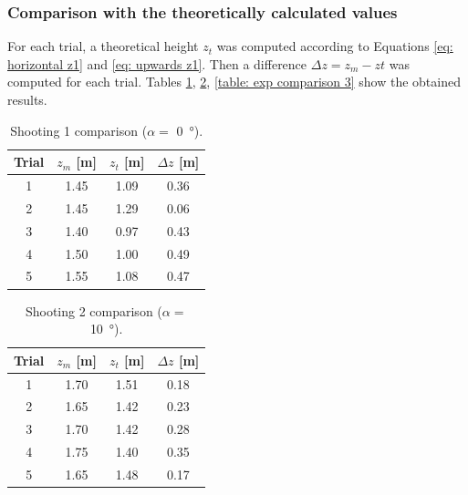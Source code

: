 		\subsubsection{Comparison with the theoretically calculated values}

			For each trial, a theoretical height $z_{t}$ was computed according to Equations \eqref{eq: horizontal z1} and \eqref{eq: upwards z1}. Then a difference $ \Delta z = z_{m} - z{t}$ was computed for each trial. Tables \ref{table: exp comparison 1}, \ref{table: exp comparison 2}, \ref{table: exp comparison 3} show the obtained results.
			

			\begin{table}\centering
			\begin{tabular}{@{}cccc@{}}\toprule
			Trial & $ z_m$ [m] & $z_t$ [m] & $\Delta z$ [m] \\ \midrule

			1 & 1.45 & 1.09 & 0.36 \\
			2 & 1.45 & 1.29 & 0.06 \\
			3 & 1.40 & 0.97 & 0.43 \\
			4 & 1.50 & 1.00 & 0.49 \\
			5 & 1.55 & 1.08 & 0.47 \\
		
			\bottomrule
			\end{tabular}
			\caption{Shooting 1 comparison ($\alpha = $ \SI{0}{\degree}).}
			\label{table: exp comparison 1}
			\end{table}
			

			\begin{table}\centering
			\begin{tabular}{@{}cccc@{}}\toprule
			Trial & $ z_m$ [m] & $z_t$ [m] & $\Delta z$ [m] \\ \midrule

			1 & 1.70 & 1.51 & 0.18 \\
			2 & 1.65 & 1.42 & 0.23 \\
			3 & 1.70 & 1.42 & 0.28 \\
			4 & 1.75 & 1.40 & 0.35 \\
			5 & 1.65 & 1.48 & 0.17 \\
		
			\bottomrule
			\end{tabular}
			\caption{Shooting 2 comparison ($\alpha = $ \SI{10}{\degree}).}
			\label{table: exp comparison 2}
			\end{table}

